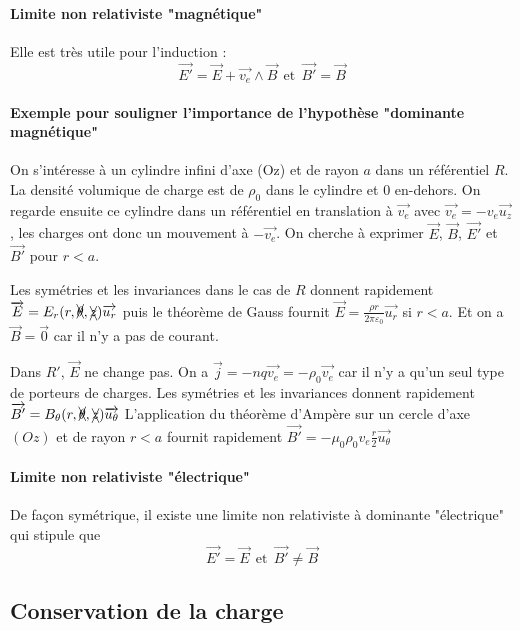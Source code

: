 \documentclass[french]{book}
\theoremstyle{plain}
\theoremstyle{definition}
\theoremstyle{remark}
\begin{document}
\paragraph{Limite non relativiste "magnétique"} Elle est très utile pour l'induction : $$\overrightarrow{E'}=\overrightarrow{E}+\overrightarrow{v_e}\wedge\overrightarrow{B} \ \ \text{et} \ \ \overrightarrow{B'}=\overrightarrow{B}$$
\paragraph{Exemple pour souligner l'importance de l'hypothèse "dominante magnétique"}
On s'intéresse à un cylindre infini d'axe (Oz) et de rayon $a$ dans un référentiel $R$. La densité volumique de charge est de $\rho_0$ dans le cylindre et $0$ en-dehors. On regarde ensuite ce cylindre dans un référentiel en translation à $\overrightarrow{v_e}$ avec $\overrightarrow{v_e}=-v_e\overrightarrow{u_z}$, les charges ont donc un mouvement à $-\overrightarrow{v_e}$. On cherche à exprimer $\overrightarrow{E}$, $\overrightarrow{B}$, $\overrightarrow{E'}$ et $\overrightarrow{B'}$ pour $r<a$. \\ \par Les symétries et les invariances dans le cas de $R$ donnent rapidement $\overrightarrow{E}=E_r(r,\xcancel{\theta},\xcancel{z})\overrightarrow{u_r}$ puis le théorème de Gauss fournit $\displaystyle\overrightarrow{E}=\frac{\rho r}{2\pi\varepsilon_0}\overrightarrow{u_r}$ si $r<a$. Et on a $\overrightarrow{B}=\overrightarrow{0}$ car il n'y a pas de courant. \\ \par Dans $R'$, $\overrightarrow{E}$ ne change pas. On a $\overrightarrow{j}=-nq\overrightarrow{v_e}=-\rho_0\overrightarrow{v_e}$ car il n'y a qu'un seul type de porteurs de charges. Les symétries et les invariances donnent rapidement $\overrightarrow{B'}=B_\theta(r,\xcancel{\theta},\xcancel{z})\overrightarrow{u_\theta}$ L'application du théorème d'Ampère sur un cercle d'axe $(Oz)$ et de rayon $r<a$ fournit rapidement $\overrightarrow{B'}=-\mu_0\rho_0 v_e\frac{r}{2}\overrightarrow{u_\theta}$
\paragraph{Limite non relativiste "électrique"} De façon symétrique, il existe une limite non relativiste à dominante "électrique" qui stipule que $$\overrightarrow{E'}=\overrightarrow{E} \ \ \text{et} \ \ \overrightarrow{B'}\ne\overrightarrow{B}$$ 
\subsection{Conservation de la charge}
\end{document}
